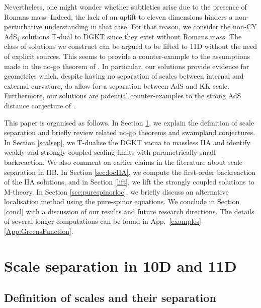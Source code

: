 \documentclass[11pt]{article}
\renewcommand{\[}{\left[}
\renewcommand{\]}{\right]}
\renewcommand{\(}{\left(}
\renewcommand{\)}{\right)}
\newcommand{\<}{\langle}
\renewcommand{\>}{\rangle}
\begin{document}
Nevertheless, one might wonder whether subtleties arise due to the presence of Romans mass. Indeed, the lack of an uplift to eleven dimensions hinders a non-perturbative understanding in that case. For that reason, we consider the non-CY AdS$_4$ solutions T-dual to DGKT since they exist without Romans mass. The class of solutions we construct can be argued to be lifted to 11D without the need of explicit sources. This seems to provide a counter-example to the assumptions made in the no-go theorem of \cite{Gautason:2015tig}. In particular, our solutions provide evidence for geometries which, despite having no separation of scales between internal and external curvature, do allow for a separation between AdS and KK scale.
Furthermore, our solutions are potential counter-examples to the strong AdS distance conjecture of \cite{Lust:2019zwm}.

This paper is organised as follows. In Section \ref{sec:scalesep10vs11D}, we explain the definition of scale separation and briefly review related no-go theorems and swampland conjectures. In Section \ref{scalsep}, we T-dualise the DGKT vacua to massless IIA and identify weakly and strongly coupled scaling limits with parametrically small backreaction. We also comment on earlier claims in the literature about scale separation in IIB. In Section \ref{sec:locIIA}, we compute the first-order backreaction of the IIA solutions, and in Section \ref{lift}, we lift the strongly coupled solutions to M-theory. In Section \ref{sec:purespinorloc}, we briefly discuss an alternative localisation method using the pure-spinor equations.  We conclude in Section \ref{concl} with a discussion of our results and future research directions. The details of several longer computations can be found in App.~\ref{examples}-\ref{App:GreensFunction}.
\\

\section{Scale separation in 10D and 11D}
\label{sec:scalesep10vs11D}
\subsection{Definition of scales and their separation}
\end{document}
